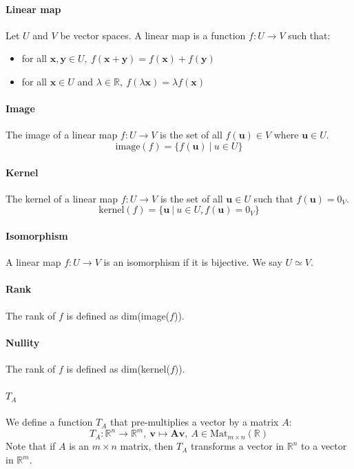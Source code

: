 \documentclass{article}
\newcommand{\R}{\mathbb{R}}
\renewcommand{\vec}[1]{\mathbf{#1}}
\begin{document}
\paragraph{Linear map}
Let $ U $ and $ V $ be vector spaces. A linear map is a function $ f : U \to V $ such that:
\begin{itemize}
\item for all $ \vec{x}, \vec{y} \in U, \ f(\vec{x} + \vec{y}) = f(\vec{x}) + f(\vec{y}) $
\item for all $ \vec{x} \in U $ and $ \lambda \in \R, \ f(\lambda \vec{x}) = \lambda f(\vec{x}) $
\end{itemize}
\paragraph{Image}
The image of a linear map $ f : U \to V $ is the set of all $ f(\vec{u}) \in V $ where $ \vec{u} \in U $.
\begin{equation}
\textrm{image}(f) = \{f(\vec{u}) \ | \ u \in U \}
\end{equation}
\paragraph{Kernel}
The kernel of a linear map $ f : U \to V $ is the set of all $ \vec{u} \in U $ such that $ f(\vec{u}) = 0_{V} $.
\begin{equation}
\textrm{kernel}(f) = \{\vec{u} \ | \ u \in U, f(\vec{u}) = 0_{V} \}
\end{equation}
\paragraph{Isomorphism}
A linear map $ f : U \to V $ is an isomorphism if it is bijective. We say $ U \simeq V $.
\paragraph{Rank}
The rank of $ f $ is defined as dim(image($ f $)).
\paragraph{Nullity}
The rank of $ f $ is defined as dim(kernel($ f $)).
\paragraph{$ T_{A} $}
We define a function $ T_{A} $ that pre-multiplies a vector by a matrix $ A $:
\begin{equation}
T_{A} : \R^{n} \to \R^{m}, \ \vec{v} \mapsto \vec{A}\vec{v}, \ A \in \textrm{Mat}_{m \times n}(\R)
\end{equation}
Note that if $ A $ is an $ m \times n $ matrix, then $ T_{A} $ transforms a vector in $ \R^{n} $ to a vector in $ \R^{m} $.
\end{document}
